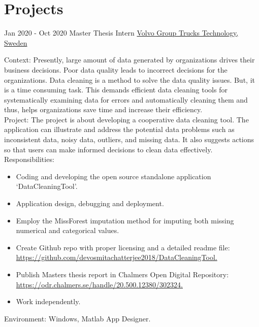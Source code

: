 \documentclass[letterpaper]{templatecv} %
\begin{document}
\section{Projects}
\begin{twenty} 
\twentyitem
    	{Jan 2020 -}
		{Oct 2020}
        {Master Thesis Intern}
        {\href{http://www.volvogroup.com/}{Volvo Group Trucks Technology, Sweden}}
        {}
        {
Context: Presently, large amount of data generated by organizations drives their business decisions. 
Poor data quality leads to incorrect decisions for the organizations. Data cleaning is a method to solve the data quality issues. But, it is a time consuming task. This demands efficient data cleaning tools for systematically examining data for errors and automatically cleaning them and thus, helps organizations save time and increase their efficiency. \\
Project: The project is about developing a cooperative data cleaning tool. The application can illustrate and address the potential data problems such as inconsistent data, noisy data, outliers, and missing data. It also suggests actions so that users can make informed decisions to clean data effectively.\\
Responsibilities:
\begin{itemize}
\item Coding and developing the open source standalone application ‘DataCleaningTool’.
\item Application design, debugging and deployment.
\item Employ the MissForest imputation method for imputing both missing numerical and categorical values.
\item Create Github repo with proper licensing and a detailed readme file: \\ \href{https://github.com/devosmitachatterjee2018/DataCleaningTool}{https://github.com/devosmitachatterjee2018/DataCleaningTool.}
\item Publish Masters thesis report in Chalmers Open Digital Repository: 
\href{https://odr.chalmers.se/handle/20.500.12380/302324}{https://odr.chalmers.se/handle/20.500.12380/302324.}
\item Work independently.
\end{itemize}

Environment: Windows, Matlab App Designer.    }
      \\
      

\end{twenty}
\end{document}
